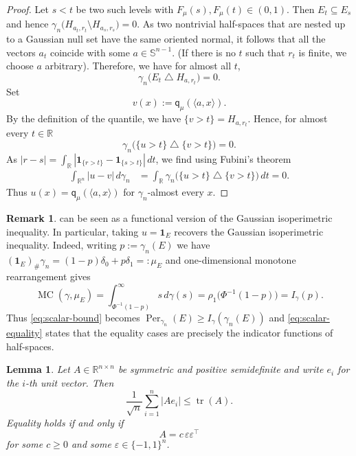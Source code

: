 \documentclass[11pt]{amsart}
\newtheorem{lemma}[lemma]{Lemma}
\theoremstyle{definition}
\newtheorem{remark}[remark]{Remark}
\newcommand{\R}{\mathbb{R}}
\newcommand{\qmu}{\mathsf q_{\mu}}
\newcommand{\MC}{\operatorname{MC}}
\newcommand{\Perg}{\operatorname{Per}_{\gamma_n}}
\newcommand{\ind}{\mathbf{1}}
\begin{document}
\begin{proof}
Let $s<t$ be two such levels with $F_\mu(s),F_\mu(t) \in (0,1)$. Then $E_t\subseteq E_s$ and hence $
  \gamma_n\bigl(H_{a_t,r_t}\setminus H_{a_s,r_s}\bigr)=0.
$ As two nontrivial half-spaces that are nested up to a Gaussian null set
have the same oriented normal, it follows that all the vectors $a_t$
coincide with some $a\in\mathbb S^{n-1}$. (If there is no $t$ such that $r_t$ is finite, we choose $a$ arbitrary). Therefore, we have for almost all $t$,
\[
\gamma_n\bigl(E_t\mathbin{\triangle}H_{a,r_t}\bigr)=0.
\]
Set
\[
  v(x):=\qmu(\langle a,x\rangle).
\]
By the definition of the quantile, we have
$  \{v>t\}
  =
  H_{a,r_t}
$. Hence, for almost every $t\in\R$
\[
  \gamma_n\bigl(
    \{u>t\}\mathbin{\triangle}\{v>t\}
  \bigr)=0.
\]
As $
  |r-s|
  =
  \int_\R
  \left|
    \mathbf 1_{\{r>t\}}
    -
    \mathbf 1_{\{s>t\}}
  \right|\,dt
$, we find using Fubini's theorem
\begin{align*}
  \int_{\R^n}|u-v|\,d\gamma_n
  &=
  \int_\R
  \gamma_n\bigl(
    \{u>t\}\mathbin{\triangle}\{v>t\}
  \bigr)\,dt
  =0.
\end{align*}
Thus $u(x)=\qmu(\langle a,x\rangle)$ for $\gamma_n$-almost every $x$.
\end{proof}

\begin{remark}
 can be seen as a functional version of the Gaussian isoperimetric inequality. In particular, taking $u=\ind_E$ recovers the
Gaussian isoperimetric inequality. Indeed, writing
$p:=\gamma_n(E)$ we have 
$
  (\ind_E)_\#\gamma_n
  =
  (1-p)\delta_0+p\delta_1
  =:\mu_E
$
and one-dimensional monotone rearrangement gives
\[
  \MC(\gamma,\mu_E)
  =
  \int_{\Phi^{-1}(1-p)}^\infty s\,d\gamma(s)
  =
  \rho_1\bigl(\Phi^{-1}(1-p)\bigr)
  =
  I_\gamma(p).
\]
Thus \eqref{eq:scalar-bound} becomes
$
  \Perg(E)\geq I_\gamma(\gamma_n(E))
$
and \eqref{eq:scalar-equality} states that the equality cases are precisely the indicator functions of half-spaces.
\end{remark}


\begin{lemma}\label{lem:matrix}
Let $A\in\mathbb R^{n\times n}$ be symmetric and positive semidefinite
and write $e_i$ for the $i$-th unit vector. Then
\[
  \frac{1}{\sqrt n}\sum_{i=1}^n |Ae_i|
  \leq
  \operatorname{tr}(A).
\]
Equality holds if and only if
\[
  A=c\,\varepsilon\varepsilon^\top
\]
for some $c\geq0$ and some $\varepsilon\in\{-1,1\}^n$.
\end{lemma}
\end{document}

